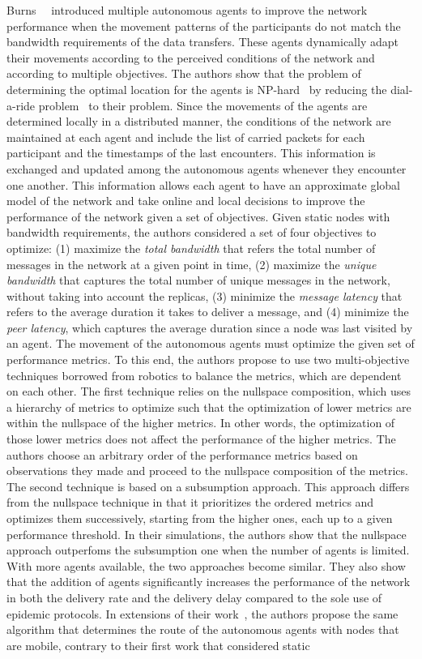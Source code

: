 Burns~\etal~\cite{burns2005mv} introduced multiple autonomous agents to improve the network performance when the movement patterns of the participants do not match the bandwidth requirements of the data transfers. These agents dynamically adapt their movements according to the perceived conditions of the network and according to multiple objectives. The authors show that the problem of determining the optimal location for the agents is NP-hard~\cite{burns2008mora} by reducing the dial-a-ride problem~\cite{savelsbergh1985local} to their problem. Since the movements of the agents are determined locally in a distributed manner, the conditions of the network are maintained at each agent and include the list of carried packets for each participant and the timestamps of the last encounters. This information is exchanged and updated among the autonomous agents whenever they encounter one another. This information allows each agent to have an approximate global model of the network and take online and local decisions to improve the performance of the network given a set of objectives. Given static nodes with bandwidth requirements, the authors considered a set of four objectives to optimize: (1) maximize the \textit{total bandwidth} that refers the total number of messages in the network at a given point in time, (2) maximize the \textit{unique bandwidth} that captures the total number of unique messages in the network, without taking into account the replicas, (3) minimize the \textit{message latency} that refers to the average duration it takes to deliver a message, and (4) minimize the \textit{peer latency}, which captures the average duration since a node was last visited by an agent. The movement of the autonomous agents must optimize the given set of performance metrics. To this end, the authors propose to use two multi-objective techniques borrowed from robotics to balance the metrics, which are dependent on each other. The first technique relies on the nullspace composition, which uses a hierarchy of metrics to optimize such that the optimization of lower metrics are within the nullspace of the higher metrics. In other words, the optimization of those lower metrics does not affect the performance of the higher metrics. The authors choose an arbitrary order of the performance metrics based on observations they made and proceed to the nullspace composition of the metrics. The second technique is based on a subsumption approach. This approach differs from the nullspace technique in that it prioritizes the ordered metrics and optimizes them successively, starting from the higher ones, each up to a given performance threshold. In their simulations, the authors show that the nullspace approach outperfoms the subsumption one when the number of agents is limited. With more agents available, the two approaches become similar. They also show that the addition of agents significantly increases the performance of the network in both the delivery rate and the delivery delay compared to the sole use of epidemic protocols. In extensions of their work~\cite{burns2008mora,burns2006autonomous}, the authors propose the same algorithm that determines the route of the autonomous agents with nodes that are mobile, contrary to their first work that considered static 